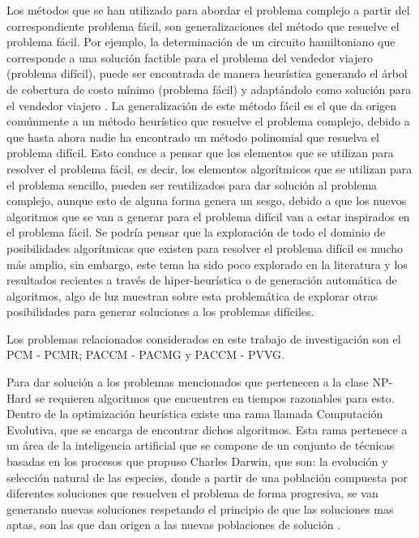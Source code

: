 Los métodos que se han utilizado para abordar el problema complejo a partir del correspondiente problema fácil, son generalizaciones del método que resuelve el problema fácil. Por ejemplo, la determinación de un circuito hamiltoniano que corresponde a una solución factible para el problema del vendedor viajero (problema difícil), puede ser encontrada de manera heurística generando el árbol de cobertura de costo mínimo (problema fácil) y adaptándolo como solución para el vendedor viajero \citep{Applegate09}. La generalización de este método fácil es el que da origen comúnmente a un método heurístico que resuelve el problema complejo, debido a que hasta ahora nadie ha encontrado un método polinomial que resuelva el problema difícil. Esto conduce a pensar que los elementos que se utilizan para resolver el problema fácil, es decir, los elementos algorítmicos que se utilizan para el problema sencillo, pueden ser reutilizados para dar solución al problema complejo, aunque esto de alguna forma genera un sesgo, debido a que los nuevos algoritmos que se van a generar para el problema difícil van a estar inspirados en el problema fácil. Se podría pensar que la exploración de todo el dominio de posibilidades algorítmicas que existen para resolver el problema difícil es mucho más amplio, sin embargo, este tema ha sido poco explorado en la literatura y los resultados recientes a través de hiper-heurística o de generación automática de algoritmos, algo de luz muestran sobre esta problemática de explorar otras posibilidades para generar soluciones a los problemas difíciles.


Los problemas relacionados considerados en este trabajo de investigación son el PCM - PCMR; PACCM - PACMG y PACCM - PVVG. 

Para dar solución a los problemas mencionados que pertenecen a la clase NP-Hard se requieren algoritmos que encuentren en tiempos razonables para esto. Dentro de la optimización heurística existe una rama llamada Computación Evolutiva, que se encarga de encontrar dichos algoritmos. Esta rama pertenece a un área de la inteligencia artificial que se compone de un conjunto de técnicas basadas en los procesos que propuso Charles Darwin, que son: la evolución y selección natural de las especies, donde a partir de una población compuesta por diferentes soluciones que resuelven el problema de forma progresiva, se van generando nuevas soluciones respetando el principio de que las soluciones mas aptas, son las que dan origen a las nuevas poblaciones de solución \citep{koza1999genetic}. 

